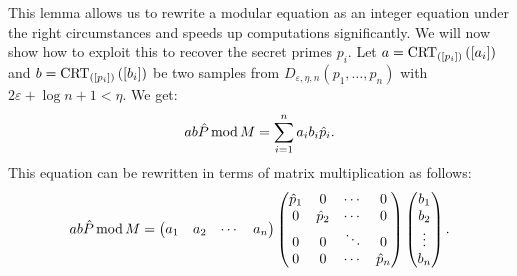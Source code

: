 \documentclass[english]{scrartcl}
\theoremstyle{plain}
\theoremstyle{definition}
\begin{document}
    This lemma allows us to rewrite a modular equation as an integer equation under the right circumstances and speeds up computations significantly.
    We will now show how to exploit this to recover the secret primes $p_i$.
    Let $a = \operatorname{CRT}_{([p_{i}])}\left(\left[a_i\right]\right)$ and $b = \operatorname{CRT}_{([p_{i}])}\left(\left[b_i\right]\right)$ be two samples from $D_{\varepsilon, \eta, n}(p_1, \dots, p_n)$ with $2\varepsilon + \log n + 1 < \eta$.
    We get:
    \begin{equation*}
        ab\hat{P} \operatorname{mod} M = \sum_{i=1}^n a_i b_i \hat{p}_i.
    \end{equation*}
    This equation can be rewritten in terms of matrix multiplication as follows:
    \begin{equation*}
        ab\hat{P} \operatorname{mod} M =
        \begin{pmatrix}
            a_1 & a_2 & \cdots & a_n
        \end{pmatrix}
        \begin{pmatrix}
            \hat{p}_1 & 0 & \cdots & 0 \\
            0 & \hat{p}_2 & \cdots & 0 \\
            0 & 0 & \ddots & 0 \\
            0 & 0 & \cdots & \hat{p}_n
        \end{pmatrix}
        \begin{pmatrix}
            b_1 \\
            b_2 \\
            \vdots \\
            b_n
        \end{pmatrix}.
    \end{equation*}
\end{document}
